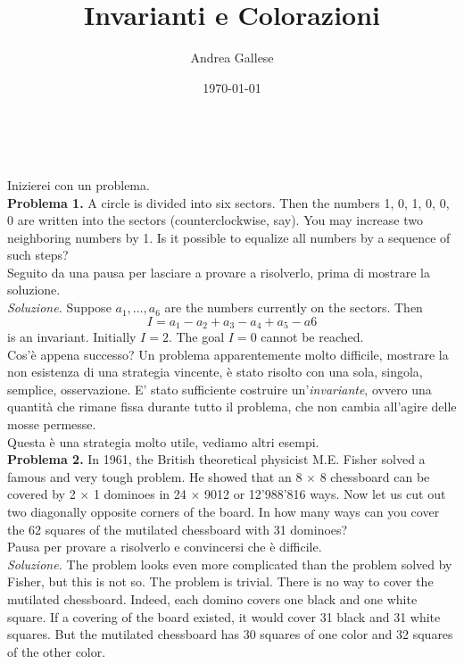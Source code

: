 \documentclass[a4paper]{article}
\title{Invarianti e Colorazioni}\let\Title\@title
\author{Andrea Gallese}\let\Author\@author
\date{\today}\let\Date\@date
\newcommand{\Intitola}{\begin{center}
		\vspace*{0,5 cm}
		{\Huge \textsc{\Title}} \\
		\vspace{0,5 cm}
		\textsc{\Author} \hspace{1cm} \textsc{\Date}
		\thispagestyle{empty}
		\vspace{0,7 cm}
\end{center}}
\theoremstyle{remark}
\theoremstyle{definition}
\begin{document}
\Intitola
\small

\begin{multicols}{2}
	\textsf{Inizierei con un problema.} \\
	
	\textbf{Problema 1.} A circle is divided into six sectors. Then the numbers 1, 0, 1, 0, 0, 0 are written into the sectors (counterclockwise, say). You may increase two neighboring numbers by 1. Is it possible to equalize all numbers by a sequence of such steps? \\
	
	\textsf{Seguito da una pausa per lasciare a provare a risolverlo, prima di mostrare la soluzione.} \\
	
	\emph{Soluzione.} Suppose $ a_1,\dots,a_6 $ are the numbers currently on the sectors. Then \begin{equation*}
	I =
	a_1 -a_2 +a_3 -a_4 +a_5 -a6
	\end{equation*} is an invariant. Initially $ I = 2 $. The goal $ I = 0 $ cannot
	be reached. \\
	
	\textsf{Cos'è appena successo? Un problema apparentemente molto difficile, mostrare la non esistenza di una strategia vincente, è stato risolto con una sola, singola, semplice, osservazione. E' stato sufficiente costruire un'\textit{invariante}, ovvero una quantità che rimane fissa durante tutto il problema, che non cambia all'agire delle mosse permesse.} \\
	
	\textsf{Questa è una strategia molto utile, vediamo altri esempi.}\\
	
	\textbf{Problema 2.} In 1961, the British theoretical physicist M.E. Fisher solved a famous and very
	tough problem. He showed that an 8 $ \times $ 8 chessboard can be covered by 2 $ \times $ 1
	dominoes in 24 $ \times $ 9012 or 12'988'816 ways. Now let us cut out two diagonally
	opposite corners of the board. In how many ways can you cover the 62 squares of
	the mutilated chessboard with 31 dominoes? \\
	
	\textsf{Pausa per provare a risolverlo e convincersi che è difficile.} \\
	
	\emph{Soluzione.} The problem looks even more complicated than the problem solved by Fisher,
	but this is not so. The problem is trivial. There is no way to cover the mutilated
	chessboard. Indeed, each domino covers one black and one white square. If a
	covering of the board existed, it would cover 31 black and 31 white squares. But
	the mutilated chessboard has 30 squares of one color and 32 squares of the other
	color. \\
	

\end{multicols}
\end{document}
